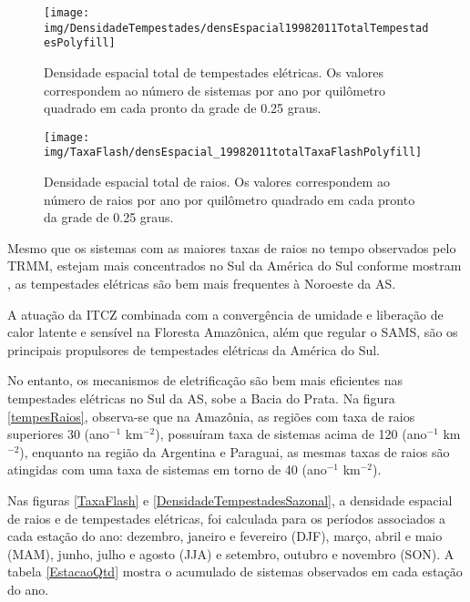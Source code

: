 \begin{figure}[!ht]
 \centering
 {\texttt{[image: img/DensidadeTempestades/densEspacial19982011TotalTempestadesPolyfill]}}
\caption{Densidade espacial total de tempestades elétricas. Os valores correspondem ao número de sistemas por ano por quilômetro quadrado em cada pronto da grade de 0.25 graus.}
 \label{tempestadestotal}
\end{figure}
  
\begin{figure}[!ht]
 \centering
  {\texttt{[image: img/TaxaFlash/densEspacial\_19982011totalTaxaFlashPolyfill]}}
  \caption{Densidade espacial total de raios. Os valores correspondem ao número de raios por ano por quilômetro quadrado em cada pronto da grade de 0.25 graus.}
  \label{raiosTotal}
\end{figure}

Mesmo que os sistemas com as maiores taxas de raios no tempo observados pelo TRMM, estejam mais concentrados no Sul da América do Sul conforme mostram , as tempestades elétricas são bem mais frequentes à Noroeste da AS.

A atuação da ITCZ combinada com a convergência de umidade e liberação de calor latente e sensível na Floresta Amazônica, além que regular o SAMS, são os principais propulsores de tempestades elétricas da América do Sul. %

No entanto, os mecanismos de eletrificação são bem mais eficientes nas tempestades elétricas no Sul da AS, sobe a Bacia do Prata. Na figura \ref{tempesRaios}, observa-se que na Amazônia, as regiões com taxa de raios superiores 30 (ano$^{-1}$ km$^{-2}$), possuíram taxa de sistemas acima de 120 (ano$^{-1}$ km$^{-2}$), enquanto na região da Argentina e Paraguai, as mesmas taxas de raios são atingidas com uma taxa de sistemas em torno de 40 (ano$^{-1}$ km$^{-2}$).

Nas figuras \ref{TaxaFlash} e \ref{DensidadeTempestadesSazonal}, a densidade espacial de raios e de tempestades elétricas, foi calculada para os períodos associados a cada estação do ano: dezembro, janeiro e fevereiro (DJF), março, abril e maio (MAM), junho, julho e agosto (JJA) e setembro, outubro e novembro (SON). A tabela \ref{EstacaoQtd} mostra o acumulado de sistemas observados em cada estação do ano.


